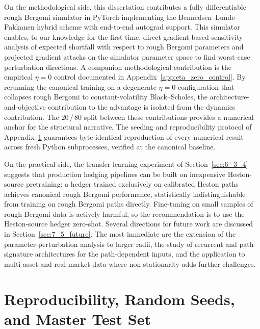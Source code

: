 \documentclass[12pt,a4paper]{article}
\theoremstyle{definition}
\theoremstyle{plain}
\theoremstyle{remark}
\theoremstyle{plain}
\begin{document}
On the methodological side, this dissertation contributes a fully
differentiable rough Bergomi simulator in PyTorch implementing the
Bennedsen--Lunde--Pakkanen hybrid scheme with end-to-end autograd
support. This simulator enables, to our knowledge for the first
time, direct gradient-based sensitivity analysis of expected
shortfall with respect to rough Bergomi parameters and projected
gradient attacks on the simulator parameter space to find
worst-case perturbation directions. A companion methodological
contribution is the empirical $\eta = 0$ control documented in
Appendix~\ref{app:eta_zero_control}. By rerunning the canonical
training on a degenerate $\eta = 0$ configuration that collapses
rough Bergomi to constant-volatility Black--Scholes, the
architecture-and-objective contribution to the advantage is
isolated from the dynamics contribution. The $20\,/\,80$ split
between these contributions provides a numerical anchor for the
structural narrative. The seeding and reproducibility protocol of
Appendix~\ref{app:reproducibility} guarantees byte-identical
reproduction of every numerical result across fresh Python
subprocesses, verified at the canonical baseline.

On the practical side, the transfer learning experiment of
Section~\ref{sec:6_3_4} suggests that production hedging pipelines
can be built on inexpensive Heston-source pretraining: a hedger
trained exclusively on calibrated Heston paths achieves canonical
rough Bergomi performance, statistically indistinguishable from
training on rough Bergomi paths directly. Fine-tuning on small
samples of rough Bergomi data is actively harmful, so the
recommendation is to use the Heston-source hedger zero-shot.
Several directions for future work are discussed in
Section~\ref{sec:7_5_future}. The most immediate are the extension
of the parameter-perturbation analysis to larger radii, the study
of recurrent and path-signature architectures for the
path-dependent inputs, and the application to multi-asset and
real-market data where non-stationarity adds further challenges.

\newpage

\clearpage
\appendix

\section{Reproducibility, Random Seeds, and Master Test Set}
\label{app:reproducibility}
\end{document}
